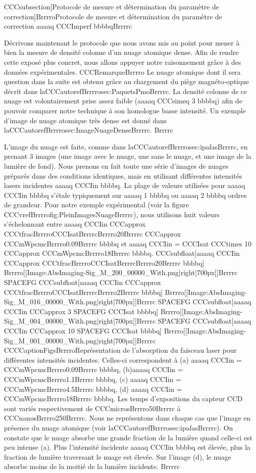 CCCsubsection[Protocole de mesure et détermination du paramètre de correction]BrrrroProtocole de mesure et détermination du paramètre de correction aaaaq CCCImperf bbbbqBrrrrc

Décrivons maintenant le protocole que nous avons mis au point pour mener à bien la mesure de densité colonne d'un nuage atomique dense. Afin de rendre cette exposé plus concret, nous allons appuyer notre raisonnement grâce à des données expérimentales.
CCCRemarqueBrrrro
Le nuage atomique dont il sera question dans la suite est obtenu grâce au chargement du piège magnéto-optique décrit dans laCCCautorefBrrrrosec:PaquetsPmoBrrrrc. La densité colonne de ce nuage est volontairement prise assez faible (aaaaq CCCsimeq 3 bbbbq) afin de pouvoir comparer notre technique à son homologue basse intensité. Un exemple d'image de nuage atomique très dense est donné dans laCCCautorefBrrrrosec:ImageNuageDenseBrrrrc.
Brrrrc



L'image du nuage est faite, comme dans laCCCautorefBrrrrosec:ipafasBrrrrc, en prenant 3 images (une image avec le nuage, une sans le nuage, et une image de la lumière de fond). Nous prenons en fait toute une série d'images de nuages préparés dans des conditions identiques, mais en utilisant différentes intensités lasers incidentes aaaaq CCCIin bbbbq. La plage de valeurs utilisées pour aaaaq CCCIin bbbbq s'étale typiquement sur aaaaq 1 bbbbq ou aaaaq 2 bbbbq ordres de grandeur. Pour notre exemple expérimental (voir la figure CCCvrefBrrrrofig:PleinImagesNuageBrrrrc), nous utilisons huit valeurs s'échelonnant entre aaaaq CCCIin CCCapprox CCCtfracBrrrroCCCIsatBrrrrcBrrrro20Brrrrc CCCapprox CCCmWpcmcBrrrro0.09Brrrrc bbbbq et  aaaaq CCCIin = CCCIsat CCCtimes 10 CCCapprox CCCmWpcmcBrrrro18Brrrrc bbbbq.
CCCsubfloat[aaaaq CCCIin CCCapprox CCCtfracBrrrroCCCIsatBrrrrcBrrrro20Brrrrc bbbbq]
Brrrro[[Image:AbsImaging-Sig_M_200_00000_With.png|right|700px]]Brrrrc SPACEFG 
CCCsubfloat[aaaaq CCCIin CCCapprox CCCtfracBrrrroCCCIsatBrrrrcBrrrro2Brrrrc bbbbq]
Brrrro[[Image:AbsImaging-Sig_M_016_00000_With.png|right|700px]]Brrrrc SPACEFG 
CCCsubfloat[aaaaq CCCIin CCCapprox 3 SPACEFG CCCIsat bbbbq]
Brrrro[[Image:AbsImaging-Sig_M_004_00000_With.png|right|700px]]Brrrrc SPACEFG 
CCCsubfloat[aaaaq CCCIin CCCapprox 10 SPACEFG CCCIsat bbbbq]
Brrrro[[Image:AbsImaging-Sig_M_001_00000_With.png|right|700px]]Brrrrc
CCCCaptionFigsBrrrroReprésentation de l'absorption du faisceau laser pour différentes intensités incidentes. Celles-ci correspondent à (a) aaaaq CCCIin = CCCmWpcmcBrrrro0.09Brrrrc bbbbq, (b)aaaaq CCCIin = CCCmWpcmcBrrrro1.1Brrrrc bbbbq, (c) aaaaq CCCIin = CCCmWpcmcBrrrro4.5Brrrrc bbbbq, (d) aaaaq CCCIin = CCCmWpcmcBrrrro18Brrrrc bbbbq.
Les temps d'expositions du capteur CCD sont variés respectivement de CCCmicrosBrrrro50Brrrrc à CCCnanosBrrrro250Brrrrc. Nous ne représentons dans chaque cas que l'image en présence du nuage atomique (voir laCCCautorefBrrrrosec:ipafasBrrrrc). 
On constate que le nuage absorbe une grande fraction de la lumière quand celle-ci est peu intense (a). Plus l'intensité incidente aaaaq CCCIin bbbbq est élevée, plus la fraction de lumière traversant le nuage est élevée. Sur l'image (d), le nuage absorbe moins de la moitié de la lumière incidente.
Brrrrc



